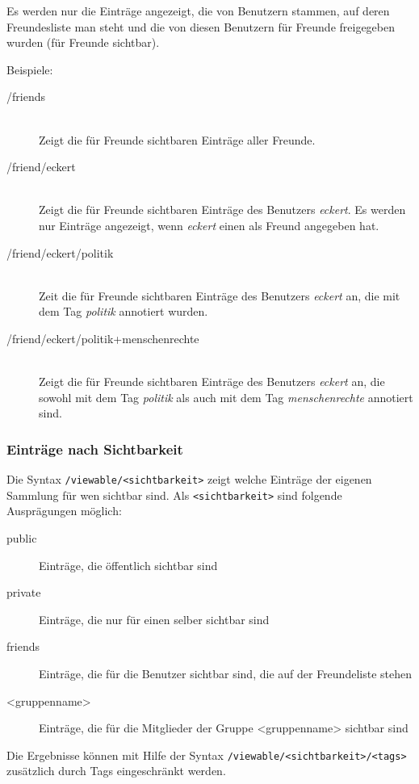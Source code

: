 Es werden nur die Einträge angezeigt, die von Benutzern stammen, auf deren Freundesliste man steht und die von diesen Benutzern für Freunde freigegeben wurden (für Freunde sichtbar).

Beispiele:
\begin{description}
    \item [/friends] \hfill \\
    Zeigt die für Freunde sichtbaren Einträge aller Freunde.
    \item [/friend/eckert] \hfill \\
    Zeigt die für Freunde sichtbaren Einträge des Benutzers \textit{eckert}. Es werden nur Einträge angezeigt, wenn \textit{eckert} einen als Freund angegeben hat.
    \item [/friend/eckert/politik] \hfill \\
    Zeit die für Freunde sichtbaren Einträge des Benutzers \textit{eckert} an, die mit dem Tag \textit{politik} annotiert wurden. 
    \item [/friend/eckert/politik+menschenrechte] \hfill \\
    Zeigt die für Freunde sichtbaren Einträge des Benutzers \textit{eckert} an, die sowohl mit dem Tag \textit{politik} als auch mit dem Tag \textit{menschenrechte} annotiert sind. 
\end{description}

\subsubsection*{Einträge nach Sichtbarkeit}
\label{sss:nachSichtbarkeit}
Die Syntax \texttt{/viewable/<sichtbarkeit>} zeigt welche Einträge der eigenen Sammlung für wen sichtbar sind. Als \texttt{<sichtbarkeit>} sind folgende Ausprägungen möglich:
\begin{description}
  \item[public] Einträge, die öffentlich sichtbar sind
	\item[private] Einträge, die nur für einen selber sichtbar sind
	\item[friends] Einträge, die für die Benutzer sichtbar sind, die auf der Freundeliste stehen
	\item[<gruppenname>] Einträge, die für die Mitglieder der Gruppe <gruppenname> sichtbar sind
\end{description}  

Die Ergebnisse können mit Hilfe der Syntax \texttt{/viewable/<sichtbarkeit>/<tags>} zusätzlich durch Tags eingeschränkt werden. 

